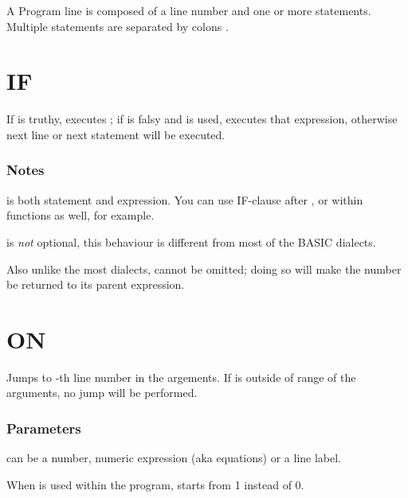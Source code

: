 \label{statements}

A Program line is composed of a line number and one or more statements. Multiple statements are separated by colons \code{:}.

\section{IF}


If  is truthy, executes ; if  is falsy and  is used, executes that expression, otherwise next line or next statement will be executed.

\subsubsection*{Notes}

\begin{itemlist}
\item {} is both statement and expression. You can use IF-clause after , or within functions as well, for example.
\item {} is \emph{not} optional, this behaviour is different from most of the BASIC dialects.
\item Also unlike the most dialects,  cannot be omitted; doing so will make the number be returned to its parent expression.
\end{itemlist}

\section{ON}


Jumps to -th line number in the argements. If  is outside of range of the arguments, no jump will be performed.

\subsubsection*{Parameters}

\begin{itemlist}
\item {} can be a number, numeric expression (aka equations) or a line label.
\item When  is used within the program,  starts from 1 instead of 0.
\end{itemlist}

